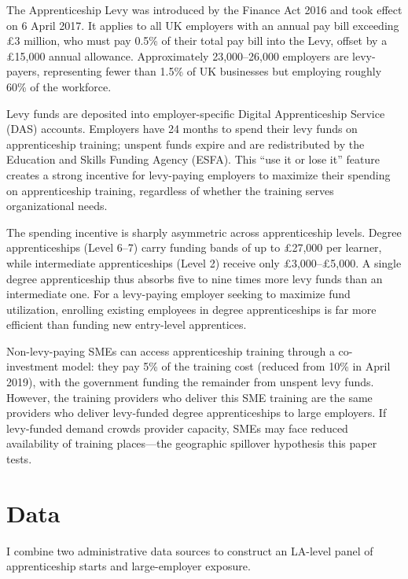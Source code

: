 \documentclass[12pt]{article}
\begin{document}
The Apprenticeship Levy was introduced by the Finance Act 2016 and took effect on 6 April 2017. It applies to all UK employers with an annual pay bill exceeding \pounds3 million, who must pay 0.5\% of their total pay bill into the Levy, offset by a \pounds15,000 annual allowance. Approximately 23,000--26,000 employers are levy-payers, representing fewer than 1.5\% of UK businesses but employing roughly 60\% of the workforce.

Levy funds are deposited into employer-specific Digital Apprenticeship Service (DAS) accounts. Employers have 24 months to spend their levy funds on apprenticeship training; unspent funds expire and are redistributed by the Education and Skills Funding Agency (ESFA). This ``use it or lose it'' feature creates a strong incentive for levy-paying employers to maximize their spending on apprenticeship training, regardless of whether the training serves organizational needs.

The spending incentive is sharply asymmetric across apprenticeship levels. Degree apprenticeships (Level 6--7) carry funding bands of up to \pounds27,000 per learner, while intermediate apprenticeships (Level 2) receive only \pounds3,000--\pounds5,000. A single degree apprenticeship thus absorbs five to nine times more levy funds than an intermediate one. For a levy-paying employer seeking to maximize fund utilization, enrolling existing employees in degree apprenticeships is far more efficient than funding new entry-level apprentices.

Non-levy-paying SMEs can access apprenticeship training through a co-investment model: they pay 5\% of the training cost (reduced from 10\% in April 2019), with the government funding the remainder from unspent levy funds. However, the training providers who deliver this SME training are the same providers who deliver levy-funded degree apprenticeships to large employers. If levy-funded demand crowds provider capacity, SMEs may face reduced availability of training places---the geographic spillover hypothesis this paper tests.

\section{Data}

I combine two administrative data sources to construct an LA-level panel of apprenticeship starts and large-employer exposure.
\end{document}
